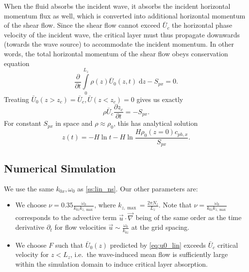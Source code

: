 \documentclass[twocolumn,
        nofootinbib,
        usenames, %
        dvipsnames %
    ]{revtex4-1}%
\newcommand*{\pd}[2]{\frac{\partial#1}{\partial#2}}
\begin{document}
When the fluid absorbs the incident wave, it absorbs the incident horizontal
momentum flux as well, which is converted into additional horizontal momentum of
the shear flow. Since the shear flow cannot exceed $\bar{U}_c$ the horizontal
phase velocity of the incident wave, the critical layer must thus propagate
downwards (towards the wave source) to accommodate the incident momentum. In
other words, the total horizontal momentum of the shear flow obeys conservation
equation
\begin{equation}
    \pd{}{t}\int\limits_0^{L_z} \rho(z) \bar{U}_0(z, t)\;\mathrm{d}z
        - S_{px} = 0.
\end{equation}
Treating $\bar{U}_0(z > z_c) = \bar{U}_c, \bar{U}(z < z_c) = 0$ gives us exactly
\begin{equation}
    \rho \bar{U}_c\pd{z_c}{t} = -S_{px}.\label{eq:zc_anal}
\end{equation}
For constant $S_{px}$ in space and $\rho \approx \rho_0$, this has analytical
solution
\begin{equation}
    z(t) = -H\ln t - H\ln \frac{H\rho_0(z = 0)c_{ph, x}}{S_{px}}.
\end{equation}

\subsection{Numerical Simulation}

We use the same $k_{0x}, \omega_0$ as \autoref{ss:lin_ns}. Our other parameters
are:
\begin{itemize}
    \item We choose $\nu = 0.35 \frac{\omega_0}{k_{0z}k_{z, \max}}$, where
        $k_{z, \max} = \frac{2\pi N_z}{L_z}$. Note that $\nu =
        \frac{\omega_0}{k_{0z} k_{z, \max}}$ corresponds to the advective term
        $\vec{u} \cdot \vec{\nabla}$ being of the same order as the time
        derivative $\partial_t$ for flow velocities $\vec{u} \sim
        \frac{\omega_0}{k_{0z}}$ at the grid spacing.

    \item We choose $F$ such that $\bar{U}_0(z)$ predicted by
        \autoref{eq:u0_lin} exceeds $\bar{U}_c$ critical velocity for $z <
        L_z$, i.e.\ the wave-induced mean flow is sufficiently large within the
        simulation domain to induce critical layer absorption.
\end{itemize}
\end{document}
